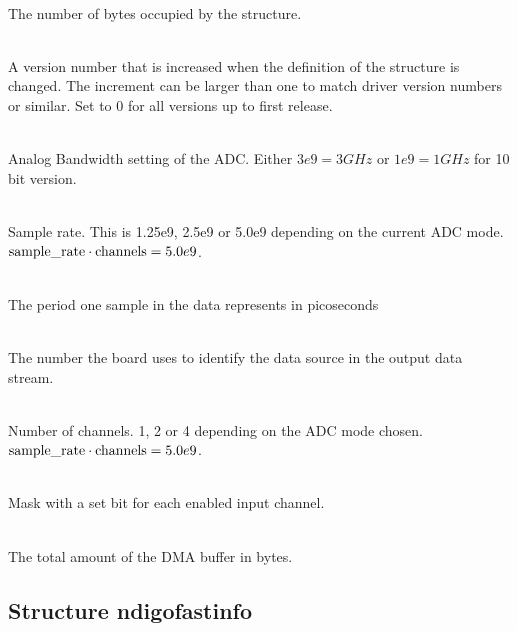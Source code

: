 			\\
			The number of bytes occupied by the structure.\par

			\\
			A version number that is increased when the definition of the structure is changed. The increment can be larger than one to match driver version numbers or similar. Set to 0 for all versions up to
first release.\par

			\\
			Analog Bandwidth setting of the ADC. Either $3e9 = 3GHz$ or $1e9=1GHz$ for 10 bit version.\par

			\\
			Sample rate. This is 1.25e9, 2.5e9 or 5.0e9 depending on the current ADC mode. $\text{sample\textunderscore rate}\cdot \text{channels} = 5.0e9$.\par
			
			\\
			The period one sample in the data represents in picoseconds\par

			\\
			The number the board uses to identify the data source in the output data stream.\par

			\\
			Number of channels. 1, 2 or 4 depending on the ADC mode chosen. $\text{sample\textunderscore rate}\cdot\text{channels} = 5.0e9$.\par

			\\
			Mask with a set bit for each enabled input channel.\par

			\\
			The total amount of the DMA buffer in bytes.\par

		
		\subsection{Structure ndigo\tu fast\tu info}
		
